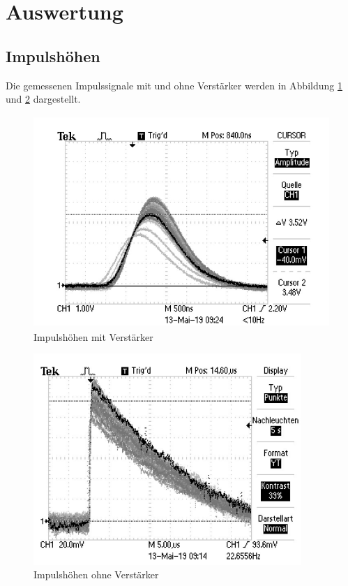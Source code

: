 \section{Auswertung}
\label{sec:Auswertung}

\subsection{Impulshöhen}

Die gemessenen Impulssignale mit und ohne Verstärker werden in Abbildung \ref{fig:mit} und \ref{fig:ohne} dargestellt.

\begin{figure}[H]
  \centering
  \includegraphics[height=8cm]{mitverstaerker.png}
  \caption{Impulshöhen mit Verstärker}
  \label{fig:mit}
\end{figure}

\begin{figure}[H]
  \centering
  \includegraphics[height=8cm]{ohneverstaerker.png}
  \caption{Impulshöhen ohne Verstärker}
  \label{fig:ohne}
\end{figure}

